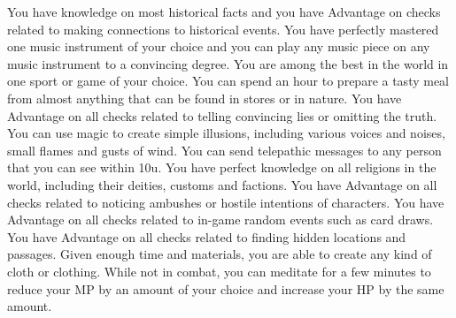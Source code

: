 \vfill
{}
{
	You have knowledge on most historical facts and you have Advantage on checks related to making connections to historical events. 	 
}
\vfill
{}
{
	You have perfectly mastered one music instrument of your choice and you can play any music piece on any music instrument to a convincing degree.
}
\vfill
{}
{
	You are among the best in the world in one sport or game of your choice.
}
\vfill
{}
{
	You can spend an hour to prepare a tasty meal from almost anything that can be found in stores or in nature.
}
\vfill
{}
{
	You have Advantage on all checks related to telling convincing lies or omitting the truth.
}
\vfill
{}
{
	You can use magic to create simple illusions, including various voices and noises, small flames and gusts of wind.
}
\vfill
{}
{
	You can send telepathic messages to any person that you can see within 10u.
}
\vfill
{}
{
	You have perfect knowledge on all religions in the world, including their deities, customs and factions.
}
\vfill
{}
{
	You have Advantage on all checks related to noticing ambushes or hostile intentions of characters.
}
\vfill
{}
{
	You have Advantage on all checks related to in-game random events such as card draws.
}
\vfill
{}
{
	You have Advantage on all checks related to finding hidden locations and passages. 	 
}
\vfill
{}
{
	Given enough time and materials, you are able to create any kind of cloth or clothing.
}
\vfill
{}
{
	While not in combat, you can meditate for a few minutes to reduce your MP by an amount of your choice and increase your HP by the same amount.
}
%
\clearpage
